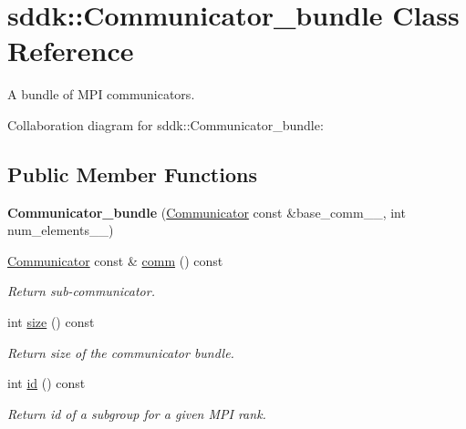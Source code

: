 \hypertarget{classsddk_1_1_communicator__bundle}{}\section{sddk\+:\+:Communicator\+\_\+bundle Class Reference}
\label{classsddk_1_1_communicator__bundle}


A bundle of M\+P\+I communicators.  




Collaboration diagram for sddk\+:\+:Communicator\+\_\+bundle\+:
\subsection*{Public Member Functions}
\begin{DoxyCompactItemize}
\item 
\hypertarget{classsddk_1_1_communicator__bundle_af2f1ba7962929bc53ea12b53e91519f4}{}{\bfseries Communicator\+\_\+bundle} (\hyperlink{classsddk_1_1_communicator}{Communicator} const \&base\+\_\+comm\+\_\+\+\_\+, int num\+\_\+elements\+\_\+\+\_\+)\label{classsddk_1_1_communicator__bundle_af2f1ba7962929bc53ea12b53e91519f4}

\item 
\hyperlink{classsddk_1_1_communicator}{Communicator} const \& \hyperlink{classsddk_1_1_communicator__bundle_af6cbfe37c5b6ba05f27f029d669722b9}{comm} () const 
\begin{DoxyCompactList}\small\item\em Return sub-\/communicator. \end{DoxyCompactList}\item 
int \hyperlink{classsddk_1_1_communicator__bundle_abd556056a1cd3e2a5f0edcf5d2151754}{size} () const 
\begin{DoxyCompactList}\small\item\em Return size of the communicator bundle. \end{DoxyCompactList}\item 
int \hyperlink{classsddk_1_1_communicator__bundle_a60527d784e6d584854e59a1edcd6748d}{id} () const 
\begin{DoxyCompactList}\small\item\em Return id of a subgroup for a given M\+P\+I rank. \end{DoxyCompactList}\end{DoxyCompactItemize}
